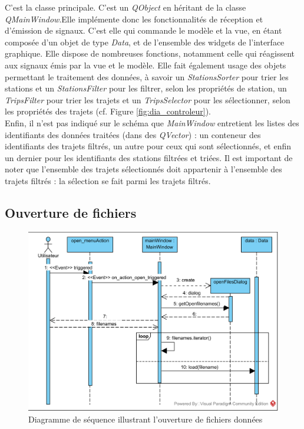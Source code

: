 \documentclass[12pt]{article}
\begin{document}
		C’est la classe principale. C’est un \textit{QObject} en héritant de la classe \textit{QMainWindow}.Elle implémente donc les fonctionnalités de réception et d’émission de signaux. C’est elle qui commande le modèle et la vue, en étant composée d’un objet de type \textit{Data}, et de l’ensemble des widgets de l’interface graphique. Elle dispose de nombreuses fonctions, notamment celle qui réagissent aux signaux émis par la vue et le modèle. Elle fait également usage des objets permettant le traitement des données, à savoir un \textit{StationsSorter} pour trier les stations et un \textit{StationsFilter} pour les filtrer, selon les propriétés de station, un \textit{TripsFilter} pour trier les trajets et un \textit{TripsSelector} pour les sélectionner, selon les propriétés des trajets (cf. Figure \ref{fig:dia_controleur}).\\
	
	Enfin, il n’est pas indiqué sur le schéma que \textit{MainWindow} entretient les listes des identifiants des données traitées (dans des \textit{QVector}) : un conteneur des identifiants des trajets filtrés, un autre pour ceux qui sont sélectionnés, et enfin un dernier pour les identifiants des stations filtrées et triées. Il est important de noter que l’ensemble des trajets sélectionnés doit appartenir à l’ensemble des trajets filtrés : la sélection se fait parmi les trajets filtrés.
		
		\subsection{Ouverture de fichiers}
		\begin{figure}[!h]
		\begin{center}
		\includegraphics[scale=1]{dia_sequence_openFiles.png}
		\caption{Diagramme de séquence illustrant l’ouverture de fichiers données}
		\label{fig:seq_openFiles}
		\end{center}
		\end{figure}
			
\end{document}
